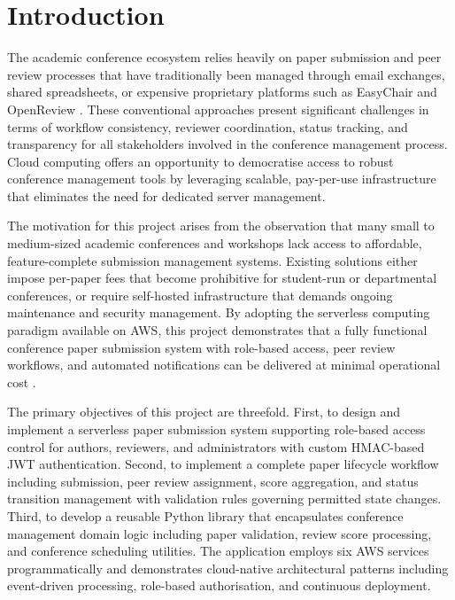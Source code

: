 \documentclass[conference]{IEEEtran}
\begin{document}
\section{Introduction}

The academic conference ecosystem relies heavily on paper submission and peer review processes that have traditionally been managed through email exchanges, shared spreadsheets, or expensive proprietary platforms such as EasyChair and OpenReview \cite{cloudpatterns}. These conventional approaches present significant challenges in terms of workflow consistency, reviewer coordination, status tracking, and transparency for all stakeholders involved in the conference management process. Cloud computing offers an opportunity to democratise access to robust conference management tools by leveraging scalable, pay-per-use infrastructure that eliminates the need for dedicated server management.

The motivation for this project arises from the observation that many small to medium-sized academic conferences and workshops lack access to affordable, feature-complete submission management systems. Existing solutions either impose per-paper fees that become prohibitive for student-run or departmental conferences, or require self-hosted infrastructure that demands ongoing maintenance and security management. By adopting the serverless computing paradigm available on AWS, this project demonstrates that a fully functional conference paper submission system with role-based access, peer review workflows, and automated notifications can be delivered at minimal operational cost \cite{serverless}.

The primary objectives of this project are threefold. First, to design and implement a serverless paper submission system supporting role-based access control for authors, reviewers, and administrators with custom HMAC-based JWT authentication. Second, to implement a complete paper lifecycle workflow including submission, peer review assignment, score aggregation, and status transition management with validation rules governing permitted state changes. Third, to develop a reusable Python library that encapsulates conference management domain logic including paper validation, review score processing, and conference scheduling utilities. The application employs six AWS services programmatically and demonstrates cloud-native architectural patterns including event-driven processing, role-based authorisation, and continuous deployment.
\end{document}
